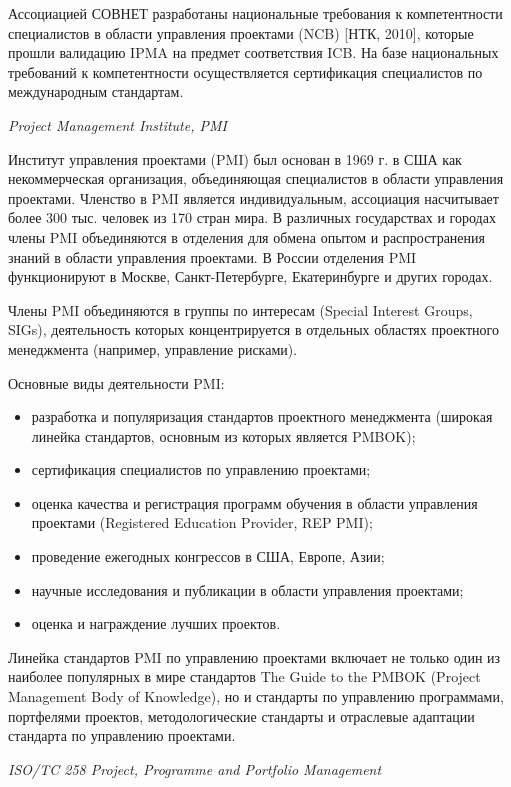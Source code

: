 Ассоциацией СОВНЕТ разработаны национальные требования к компетентности специалистов в области управления проектами (NCB) [НТК, 2010], которые прошли валидацию IPMA на предмет соответствия ICB. На базе национальных требований к компетентности осуществляется сертификация специалистов по международным стандартам.

\textit{Project Management Institute, PMI}

Институт управления проектами (PMI) был основан в 1969 г. в США как некоммерческая организация, объединяющая специалистов в области управления проектами.
Членство в PMI является индивидуальным, ассоциация насчитывает более 300 тыс. человек из 170 стран мира.
В различных государствах и городах члены PMI объединяются в отделения для обмена опытом и распространения знаний в области управления проектами.
В России отделения PMI функционируют в Москве, Санкт-Петербурге, Екатеринбурге и других городах.

Члены PMI объединяются в группы по интересам (Special Interest Groups, SIGs), деятельность которых концентрируется в отдельных областях проектного менеджмента (например, управление рисками).

Основные виды деятельности PMI:
\begin{itemize}
	\item разработка и популяризация стандартов проектного менеджмента (широкая линейка стандартов, основным из которых является PMBOK);
	\item сертификация специалистов по управлению проектами;
	\item оценка качества и регистрация программ обучения в области управления проектами (Registered Education Provider, REP PMI);
	\item проведение ежегодных конгрессов в США, Европе, Азии;
	\item научные исследования и публикации в области управления проектами;
	\item оценка и награждение лучших проектов.
\end{itemize}

Линейка стандартов PMI по управлению проектами включает не только один из наиболее популярных в мире стандартов The Guide to the PMBOK (Project Management Body of Knowledge), но и стандарты по управлению программами, портфелями проектов, методологические стандарты и отраслевые адаптации стандарта по управлению проектами.

\textit{ISO/TC 258 Project, Programme and Portfolio Management}

